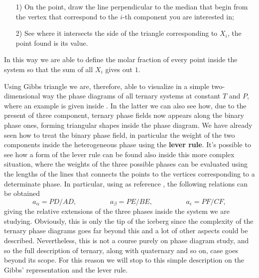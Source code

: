 \begin{enumerate}
    \item[1)] On the point, draw the line perpendicular to the median that begin from the vertex that correspond to the $i$-th component you are interested in;
    \item[2)] See where it intersects the side of the triangle corresponding to $X_i$, the point found is its value.
\end{enumerate}
In this way we are able to define the molar fraction of every point inside the system so that the sum of all $X_i$ gives out $1$.

Using Gibbs triangle we are, therefore, able to visualize in a simple two-dimensional way the phase diagrams of all ternary systems at constant $T$ and $P$, where an example is given inside . In the latter we can also see how, due to the present of three component, ternary phase fields now appears along the binary phase ones, forming triangular shapes inside the phase diagram. We have already seen how to treat the binary phase field, in particular the weight of the two components inside the heterogeneous phase using the \textbf{lever rule}. It's possible to see how a form of the lever rule can be found also inside this more complex situation, where the weights of the three possible phases can be evaluated using the lengths of the lines that connects the points to the vertices corresponding to a determinate phase. In particular, using as reference , the following relations can be obtained
\begin{equation}
    a_\alpha = PD/AD, \hspace{2cm} a_\beta = PE/BE, \hspace{2cm} a_\epsilon = PF/CF,
\end{equation}
giving the relative extensions of the three phases inside the system we are studying. Obviously, this is only the tip of the iceberg since the complexity of the ternary phase diagrams goes far beyond this and a lot of other aspects could be described. Nevertheless, this is not a course purely on phase diagram study, and so the full description of ternary, along with quaternary and so on, case goes beyond its scope. For this reason we will stop to this simple description on the Gibbs' representation and the lever rule.